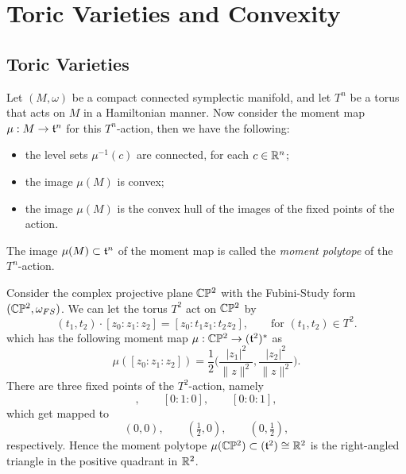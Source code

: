 
\chapter{Toric Varieties and Convexity}

\section{Toric Varieties}

\begin{thm}
	Let $(M,\omega)$ be a compact connected symplectic manifold, and let $T^{n}$ be a torus that acts on $M$ in a Hamiltonian manner. Now consider the moment map $\mu : M \rightarrow \mathfrak{t}^{n}$ for this $T^{n}$-action, then we have the following:
	\begin{itemize}
		\item the level sets $\mu^{-1}(c)$ are connected, for each $c \in \mathbb{R}^{n}$;
		\item the image $\mu(M)$ is convex;
		\item the image $\mu(M)$ is the convex hull of the images of the fixed points of the action.
	\end{itemize}
\end{thm}

The image $\mu(M) \subset \mathfrak{t}^{n}$ of the moment map is called the \emph{moment polytope} of the $T^{n}$-action.

\begin{ex}
	Consider the complex projective plane $\mathbb{C}\mathbb{P}^{2}$ with the Fubini-Study \K form $(\mathbb{C}\mathbb{P}^{2}, \omega_{FS})$. We can let the torus $T^{2}$ act on $\mathbb{C}\mathbb{P}^{2}$ by
	\begin{equation*}
	(t_{1}, t_{2}) \cdot [z_{0}:z_{1}:z_{2}] = [z_{0}: t_{1}z_{1}: t_{2}z_{2}],\qquad \text{for } (t_{1}, t_{2}) \in T^{2}.
	\end{equation*}
	which has the following moment map $\mu: \mathbb{C}\mathbb{P}^{2} \rightarrow (\mathfrak{t}^{2})^{\ast}$ as
	\begin{equation*}
	\mu([z_{0}:z_{1}:z_{2}]) = \frac{1}{2}\bigg( \frac{|z_{1}|^{2}}{\|z\|^{2}}, \frac{|z_{2}|^{2}}{\|z\|^{2}} \bigg).
	\end{equation*}
	There are three fixed points of the $T^{2}$-action, namely
	\begin{equation*}
	[1:0:0],\qquad [0:1:0],\qquad [0:0:1],
	\end{equation*}
	which get mapped to
	\begin{equation*}
	(0,0),\qquad (\tfrac{1}{2},0),\qquad (0,\tfrac{1}{2}),
	\end{equation*}
	respectively. Hence the moment polytope $\mu(\mathbb{C}\mathbb{P}^{2}) \subset (\mathfrak{t}^{2}) \cong \mathbb{R}^{2}$ is the right-angled triangle in the positive quadrant in $\mathbb{R}^{2}$.
\end{ex}



